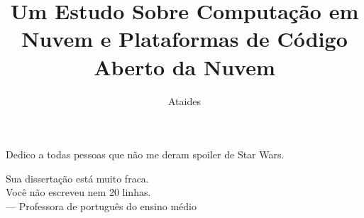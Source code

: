 \documentclass[ti]{texufpel}
\title{Um Estudo Sobre Computação em Nuvem e Plataformas de Código Aberto da Nuvem}
\author{Ataides}{Vítor Alano de}
\begin{document}
\maketitle 

\sloppy

\fichacatalografica

\begin{dedicatoria}
  Dedico a todas pessoas que não me deram spoiler de Star Wars.
\end{dedicatoria}

\begin{epigrafe}
	Sua dissertação está muito fraca. \\
	Você não escreveu nem 20 linhas. \\
  {\sc --- Professora de português do ensino médio}
\end{epigrafe}
\end{document}
